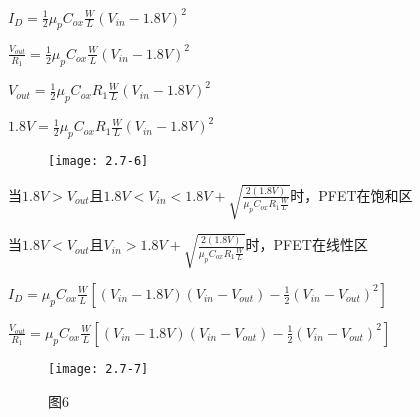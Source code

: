 $I_D=\frac{1}{2}\mu_pC_{ox}\frac{W}{L}(V_{in}-1.8V)^2$

$\frac{V_{out}}{R_1}=\frac{1}{2}\mu_pC_{ox}\frac{W}{L}(V_{in}-1.8V)^2$

$V_{out}=\frac{1}{2}\mu_pC_{ox}{R_1}\frac{W}{L}(V_{in}-1.8V)^2$

$1.8V=\frac{1}{2}\mu_pC_{ox}{R_1}\frac{W}{L}(V_{in}-1.8V)^2$

\begin{figure}[H] %
	\begin{minipage}{\linewidth}
		\texttt{[image: 2.7-6]}
	\end{minipage}
\end{figure}

当$1.8V>V_{out}$且$1.8V<V_{in}<1.8V+\sqrt{\frac{2(1.8V)}{\mu_pC_{ox}{R_1}\frac{W}{L}}}$时，PFET在饱和区

当$1.8V<V_{out}$且$V_{in}>1.8V+\sqrt{\frac{2(1.8V)}{\mu_pC_{ox}{R_1}\frac{W}{L}}}$时，PFET在线性区

$I_D=\mu_pC_{ox}\frac{W}{L}[(V_{in}-1.8V)(V_{in}-V_{out})-\frac{1}{2}(V_{in}-V_{out})^2]$

$\frac{V_{out}}{R_1}=\mu_pC_{ox}\frac{W}{L}[(V_{in}-1.8V)(V_{in}-V_{out})-\frac{1}{2}(V_{in}-V_{out})^2]$

















\begin{figure}[H] %
	\begin{minipage}{\linewidth}
		\texttt{[image: 2.7-7]}
	\end{minipage}
	\caption*{图6} %
\end{figure}














